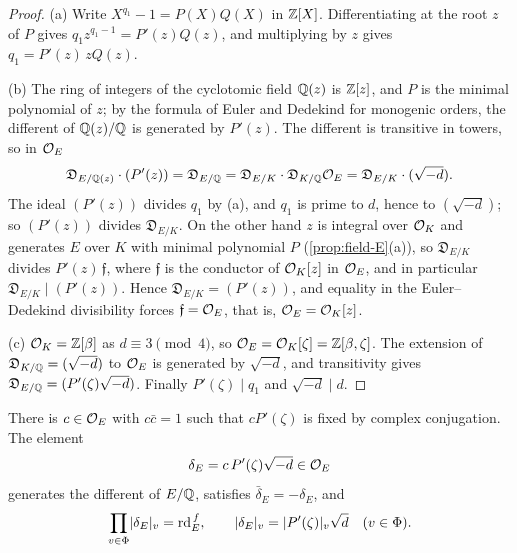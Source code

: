 \begin{proof}
(a) Write $X^{q_1}-1=P(X)Q(X)$ in $\mathbb{Z}[X]$. Differentiating at the root $z$ of $P$ gives
$q_1z^{q_1-1}=P'(z)Q(z)$, and multiplying by $z$ gives $q_1=P'(z)\,zQ(z)$.

(b) The ring of integers of the cyclotomic field $\mathbb{Q}(z)$ is $\mathbb{Z}[z]$, and $P$ is the minimal
polynomial of $z$; by the formula of Euler and Dedekind for monogenic orders, the different of
$\mathbb{Q}(z)/\mathbb{Q}$ is generated by $P'(z)$. The different is transitive in towers, so in $\mathcal{O}_E$
\[
  \mathfrak D_{E/\mathbb{Q}(z)}\cdot(P'(z))=\mathfrak D_{E/\mathbb{Q}}=\mathfrak D_{E/K}\cdot\mathfrak D_{K/\mathbb{Q}}\mathcal{O}_E
  =\mathfrak D_{E/K}\cdot(\sqrt{-d}).
\]
The ideal $(P'(z))$ divides $q_1$ by (a), and $q_1$ is prime to $d$, hence to $(\sqrt{-d})$; so
$(P'(z))$ divides $\mathfrak D_{E/K}$. On the other hand $z$ is integral over $\mathcal{O}_K$ and generates
$E$ over $K$ with minimal polynomial $P$ (\cref{prop:field-E}(a)), so $\mathfrak D_{E/K}$ divides
$P'(z)\,\mathfrak f$, where $\mathfrak f$ is the conductor of $\mathcal{O}_K[z]$ in $\mathcal{O}_E$, and in particular
$\mathfrak D_{E/K}\mid(P'(z))$. Hence $\mathfrak D_{E/K}=(P'(z))$, and equality in the Euler--Dedekind
divisibility forces $\mathfrak f=\mathcal{O}_E$, that is, $\mathcal{O}_E=\mathcal{O}_K[z]$.

(c) $\mathcal{O}_K=\mathbb{Z}[\beta]$ as $d\equiv3\pmod4$, so $\mathcal{O}_E=\mathcal{O}_K[\zeta]=\mathbb{Z}[\beta,\zeta]$. The extension
of $\mathfrak D_{K/\mathbb{Q}}=(\sqrt{-d})$ to $\mathcal{O}_E$ is generated by $\sqrt{-d}$, and transitivity gives
$\mathfrak D_{E/\mathbb{Q}}=(P'(\zeta)\sqrt{-d})$. Finally $P'(\zeta)\mid q_1$ and $\sqrt{-d}\mid d$.
\end{proof}

\begin{proposition}\label{prop:delta-E}
There is $c\in\mathcal{O}_E$ with $c\bar c=1$ such that $cP'(\zeta)$ is fixed by complex conjugation. The
element
\[
  \delta_E=c\,P'(\zeta)\sqrt{-d}\in\mathcal{O}_E
\]
generates the different of $E/\mathbb{Q}$, satisfies $\bar\delta_E=-\delta_E$, and
\[
  \prod_{v\in\Phi}\lvert \delta_E\rvert_v=\mathrm{rd}_E^{\,f},\qquad
  \lvert \delta_E\rvert_v=\lvert P'(\zeta)\rvert_v\sqrt d\quad(v\in\Phi).
\]
\end{proposition}

